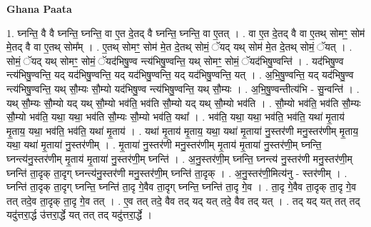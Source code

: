 \documentclass[17pt]{extarticle}
\begin{document}
\textbf{Ghana Paata } \newline

1. घ्नन्ति॒ वै वै घ्नन्ति॒ घ्नन्ति॒ वा ए॒त दे॒तद् वै घ्नन्ति॒ घ्नन्ति॒ वा ए॒तत् । . वा ए॒त दे॒तद् वै वा ए॒तथ् सोमꣳ॒॒ सोम॑ मे॒तद् वै वा ए॒तथ् सोम᳚म् । . ए॒तथ् सोमꣳ॒॒ सोम॑ मे॒त दे॒तथ् सोमं॒ ॅयद् यथ् सोम॑ मे॒त दे॒तथ् सोमं॒ ॅयत् । . सोमं॒ ॅयद् यथ् सोमꣳ॒॒ सोमं॒ ॅयद॑भिषु॒ण्व न्त्य॑भिषु॒ण्वन्ति॒ यथ् सोमꣳ॒॒ सोमं॒ ॅयद॑भिषु॒ण्वन्ति॑ । . यद॑भिषु॒ण्व न्त्य॑भिषु॒ण्वन्ति॒ यद् यद॑भिषु॒ण्वन्ति॒ यद् यद॑भिषु॒ण्वन्ति॒ यद् यद॑भिषु॒ण्वन्ति॒ यत् । . अ॒भि॒षु॒ण्वन्ति॒ यद् यद॑भिषु॒ण्व न्त्य॑भिषु॒ण्वन्ति॒ यथ् सौ॒म्यः सौ॒म्यो यद॑भिषु॒ण्व न्त्य॑भिषु॒ण्वन्ति॒ यथ् सौ॒म्यः । . अ॒भि॒षु॒ण्वन्तीत्य॑भि - सु॒न्वन्ति॑ । . यथ् सौ॒म्यः सौ॒म्यो यद् यथ् सौ॒म्यो भव॑ति॒ भव॑ति सौ॒म्यो यद् यथ् सौ॒म्यो भव॑ति । . सौ॒म्यो भव॑ति॒ भव॑ति सौ॒म्यः सौ॒म्यो भव॑ति॒ यथा॒ यथा॒ भव॑ति सौ॒म्यः सौ॒म्यो भव॑ति॒ यथा᳚ । . भव॑ति॒ यथा॒ यथा॒ भव॑ति॒ भव॑ति॒ यथा॑ मृ॒ताय॑ मृ॒ताय॒ यथा॒ भव॑ति॒ भव॑ति॒ यथा॑ मृ॒ताय॑ । . यथा॑ मृ॒ताय॑ मृ॒ताय॒ यथा॒ यथा॑ मृ॒ताया॑ नु॒स्तर॑णी मनु॒स्तर॑णीम् मृ॒ताय॒ यथा॒ यथा॑ मृ॒ताया॑ नु॒स्तर॑णीम् । . मृ॒ताया॑ नु॒स्तर॑णी मनु॒स्तर॑णीम् मृ॒ताय॑ मृ॒ताया॑ नु॒स्तर॑णी॒म् घ्नन्ति॒ घ्नन्त्य॑नु॒स्तर॑णीम् मृ॒ताय॑ मृ॒ताया॑ नु॒स्तर॑णी॒म् घ्नन्ति॑ । . अ॒नु॒स्तर॑णी॒म् घ्नन्ति॒ घ्नन्त्य॑ नु॒स्तर॑णी मनु॒स्तर॑णी॒म् घ्नन्ति॑ ता॒दृक् ता॒दृग् घ्नन्त्य॑नु॒स्तर॑णी मनु॒स्तर॑णी॒म् घ्नन्ति॑ ता॒दृक् । . अ॒नु॒स्तर॑णी॒मित्य॑नु - स्तर॑णीम् । . घ्नन्ति॑ ता॒दृक् ता॒दृग् घ्नन्ति॒ घ्नन्ति॑ ता॒दृ गे॒वैव ता॒दृग् घ्नन्ति॒ घ्नन्ति॑ ता॒दृ गे॒व । . ता॒दृ गे॒वैव ता॒दृक् ता॒दृ गे॒व तत् तदे॒व ता॒दृक् ता॒दृ गे॒व तत् । . ए॒व तत् तदे॒ वैव तद् यद् यत् तदे॒ वैव तद् यत् । . तद् यद् यत् तत् तद् यदु॑त्तरा॒र्द्ध उ॑त्तरा॒र्द्धे यत् तत् तद् यदु॑त्तरा॒र्द्धे । \newline
\end{document}
